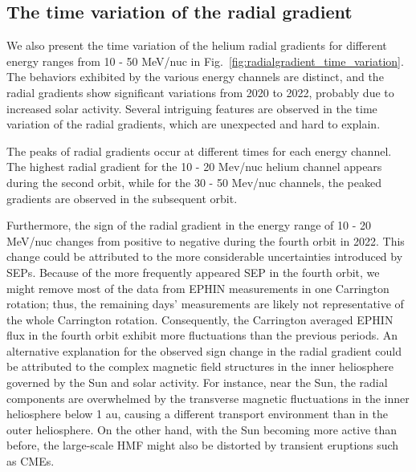 \subsection*{The time variation of the radial gradient}

We also present the time variation of the helium radial gradients for different energy ranges from 10 - 50 MeV/nuc in Fig.~\ref{fig:radialgradient_time_variation}. The behaviors exhibited by the various energy channels are distinct, and the radial gradients show significant variations from 2020 to 2022, probably due to increased solar activity. Several intriguing features are observed in the time variation of the radial gradients, which are unexpected and hard to explain.

The peaks of radial gradients occur at different times for each energy channel. The highest radial gradient for the 10 - 20 Mev/nuc helium channel appears during the second orbit, while for the 30 - 50 Mev/nuc channels, the peaked gradients are observed in the subsequent orbit.

Furthermore, the sign of the radial gradient in the energy range of 10 - 20 MeV/nuc changes from positive to negative during the fourth orbit in 2022. This change could be attributed to the more considerable uncertainties introduced by \acp{SEP}. Because of the more frequently appeared \ac{SEP} in the fourth orbit, we might remove most of the data from \ac{EPHIN} measurements in one Carrington rotation; thus, the remaining days' measurements are likely not representative of the whole Carrington rotation. Consequently, the Carrington averaged \ac{EPHIN} flux in the fourth orbit exhibit more fluctuations than the previous periods. 
An alternative explanation for the observed sign change in the radial gradient could be attributed to the complex magnetic field structures in the inner heliosphere governed by the Sun and solar activity. 
For instance, near the Sun, the radial components are overwhelmed by the transverse magnetic fluctuations \citep{Rankin2022ApJ} in the inner heliosphere below 1 au, causing a different transport environment than in the outer heliosphere.
On the other hand, with the Sun becoming more active than before, the large-scale \acs{HMF} might also be distorted by transient eruptions such as \acp{CME}.


